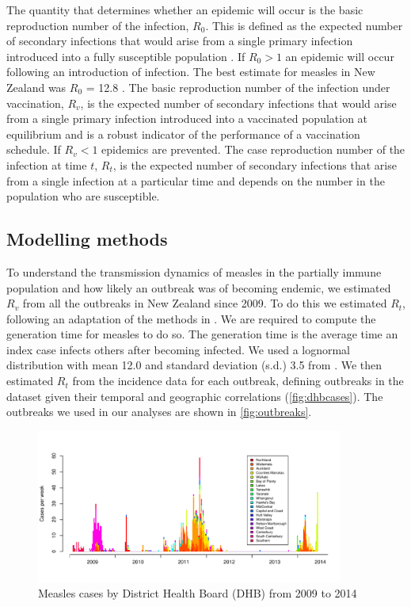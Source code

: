 \documentclass{article}
\begin{document}
The quantity that determines whether an epidemic will occur is the basic reproduction number of the infection, $R_0$. This is defined as the expected number of secondary infections that would arise from a single primary infection introduced into a fully susceptible population \citep{anderson91, diekmann13}. If $R_0 > 1$ an epidemic will occur following an introduction of infection. The best estimate for measles in New Zealand was $R_0$ = 12.8 \citep{roberts4}. The basic reproduction number of the infection under vaccination, $R_v$, is the expected number of secondary infections that would arise from a single primary infection introduced into a vaccinated population at equilibrium and is a robust indicator of the performance of a vaccination schedule. If $R_v < 1$ epidemics are prevented. The case reproduction number of the infection at time $t$, $R_t$, is the expected number of secondary infections that arise from a single infection at a particular time and depends on the number in the population who are susceptible.

\subsection{Modelling methods}

To understand the transmission dynamics of measles in the partially immune population and how likely an outbreak was of becoming endemic, we estimated $R_v$ from all the outbreaks in New Zealand since 2009. To do this we estimated $R_t$, following an adaptation of the methods in \citep{obidia12,wallinga4}. We are required to compute the generation time for measles to do so. The generation time is the average time an index case infects others after becoming infected. We used a lognormal distribution with mean 12.0 and standard deviation (s.d.) 3.5 from \citep{klinkenberg11}. We then estimated $R_t$ from the incidence data for each outbreak, defining outbreaks in the dataset given their temporal and geographic correlations (\autoref{fig:dhbcases}). The outbreaks we used in our analyses are shown in \autoref{fig:outbreaks}.

\begin{figure}[H]
      \centering
     \includegraphics[width=0.9\textwidth]{cases_by_dhb_2009_2014.pdf}
     \caption{Measles cases by District Health Board (DHB) from 2009 to 2014}
     \label{fig:dhbcases}
\end{figure}
\end{document}
